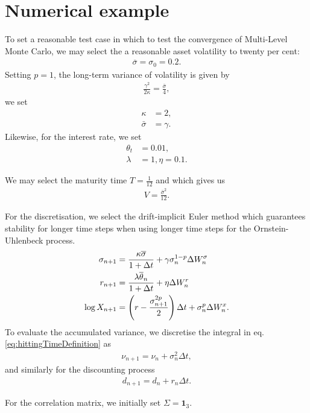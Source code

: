 \documentclass[11pt]{amsart}
\begin{document}
\section{Numerical example}

To set a reasonable test case in which to test the convergence of
Multi-Level Monte Carlo, we may select the a reasonable asset volatility
to twenty per cent:
\begin{align*}
\overline \sigma = \sigma_0 = 0.2.
\end{align*}
Setting $p=1$, the
long-term variance of volatility is given by
\begin{align*}
\frac{\gamma^2 }{2 \kappa} = \frac{\bar \sigma}{4},
\end{align*}
we set
\begin{align*}
\kappa &= 2, \\
\bar \sigma &= \gamma.
\end{align*}
Likewise, for the interest rate, we set 
\begin{align*}
\theta_t &= 0.01, \\
\lambda &=1,
\eta = 0.1.
\end{align*}

We may select the maturity time $T=\frac{1}{12}$ and which
gives us
\begin{align*}
V = \frac{\bar \sigma^2}{12}.
\end{align*}

For the discretisation, we select the drift-implicit Euler method
which guarantees stability for longer time steps when using longer
time steps for the Ornstein-Uhlenbeck process.
\begin{align}
\sigma_{n+1} &= \frac{\kappa \overline \sigma}{1+\Delta t}
+ \gamma \sigma_{n}^{1-p} \Delta W_n^{\sigma}
\\
r_{n+1} &= \frac{\lambda \overline \theta_n}{1+ \Delta t}
+ \eta \Delta W_n^r
\\
\log X_{n+1} &=
 \left( {r - \frac{\sigma^{2p}_{n+1}}{2}} \right) \Delta t
+ \sigma_n^{p} \Delta W_n^x .
\end{align}
To evaluate the accumulated variance, we discretise the integral in eq. \eqref{eq:hittingTimeDefinition} as
\begin{align}
\nu_{n+1} = \nu_n + \sigma_n^2 \Delta t,
\end{align}
and similarly for the discounting process
\begin{align}
d_{n+1} = d_n + r_n \Delta t.
\end{align}

For the correlation matrix, we initially set $\Sigma = \mathbf 1_3$.
\end{document}
